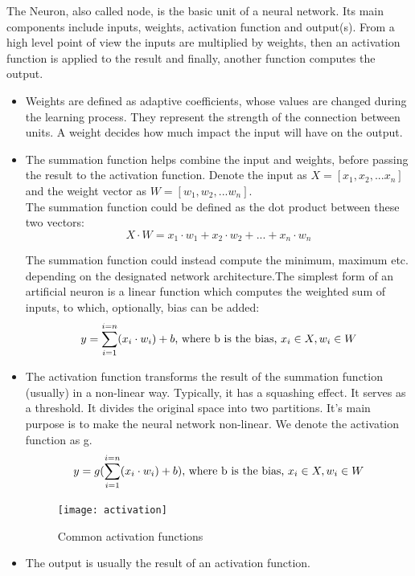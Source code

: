 The Neuron, also called node, is the basic unit of a neural network. Its main components include inputs,
weights, activation function and output(s). From a high level point of view the inputs are multiplied by 
weights, then an activation function is applied to the result and finally, another function computes the output\cite{REF:12}\cite{REF:13}. \par


\begin{itemize}
	\item Weights are defined as adaptive coefficients, whose values are changed during the learning process. They represent the strength of the connection between units. A weight decides how much impact the input will have on the output.
	
	\item The summation function helps combine the input and weights, before passing the result to the activation function. Denote the input as $X = [x_1, x_2, ...x_n]$ and the weight vector as $W = [w_1, w_2, ...w_n]$.\\
	The summation function could be defined as the dot product between these two vectors:\\
	\begin{equation}
	X \cdot W =x_1 \cdot w_1 +x_2 \cdot w_2 +...+x_n \cdot w_n
	\end{equation}

	
	The summation function could instead compute the minimum, maximum etc. depending on the designated network architecture.The simplest form of an artificial neuron is a linear function which computes the weighted sum of inputs, to which, optionally, bias can be added:
	\begin{equation}
		y = \sum_{i=1}^{i=n}(x_i \cdot w_i) + b \textnormal{, where b is the bias, $x_i \in X, w_i \in W$}
	\end{equation}

	
	\item The activation function transforms the result of the summation function (usually) in a non-linear way. Typically, it has a squashing effect. It serves as a threshold. It divides the original space into two partitions. It's main purpose is to make the neural network non-linear. We denote the activation function as g.
	\begin{equation}
		y = g(\sum_{i=1}^{i=n}(x_i \cdot w_i) + b) \textnormal{, where b is the bias, $x_i \in X, w_i \in W$}
	\end{equation}

	
	\begin{figure}[h]
		\caption[Common activation functions]{Common activation functions \cite{activation_fig} }
		\centering
		\texttt{[image: activation]}
	\end{figure}
	\item The output is usually the result of an activation function.
	
\end{itemize}

